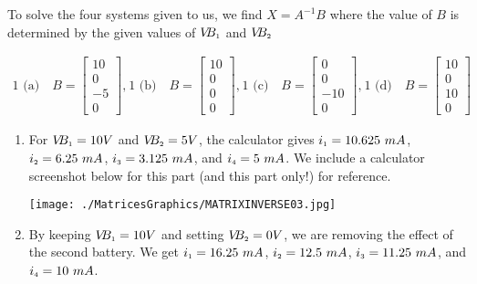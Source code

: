 \begin{ex}
\begin{enumerate}
To solve the four systems given to us, we find $X=A^{-1}B$ where the value of $B$ is determined by the given values of $V\!\!B_{\mbox{\tiny$1$}}$ and $V\!\!B_{\mbox{\tiny$2$}}$

\[\begin{array}{cccc}

\text{1 (a)} \quad B = \left[ \begin{array}{r} 10 \\ 0 \\ -5 \\ 0 \end{array} \right], & 

\text{1 (b)} \quad B = \left[ \begin{array}{r} 10 \\ 0 \\ 0 \\ 0 \end{array} \right], & 

\text{1 (c)} \quad B = \left[ \begin{array}{r} 0 \\ 0 \\ -10 \\ 0 \end{array} \right], & 

\text{1 (d)} \quad B = \left[ \begin{array}{r} 10 \\ 0 \\ 10 \\ 0 \end{array} \right] 

\end{array} \]

\begin{enumerate}

\item  For $V\!\!B_{\mbox{\tiny$1$}} = 10 V$ and $V\!\!B_{\mbox{\tiny$2$}} = 5 V$, the calculator gives $i_{\mbox{\tiny$1$}} = 10.625 \, \, mA$, $i_{\mbox{\tiny$2$}} = 6.25 \, \, mA$, $i_{\mbox{\tiny$3$}} = 3.125 \, \, mA$, and $i_{\mbox{\tiny$4$}} = 5 \, \, mA$.  We include a calculator screenshot below for this part (and this part only!) for reference.


\centerline{\texttt{[image: ./MatricesGraphics/MATRIXINVERSE03.jpg]}}


\item  By keeping  $V\!\!B_{\mbox{\tiny$1$}} = 10 V$ and setting $V\!\!B_{\mbox{\tiny$2$}} = 0 V$, we are removing the effect of the second battery. We get $i_{\mbox{\tiny$1$}} = 16.25 \, \, mA$, $i_{\mbox{\tiny$2$}} = 12.5 \, \, mA$, $i_{\mbox{\tiny$3$}} = 11.25 \, \, mA$, and $i_{\mbox{\tiny$4$}} = 10 \, \, mA$.  



\end{enumerate}
\end{enumerate}
\end{ex}
